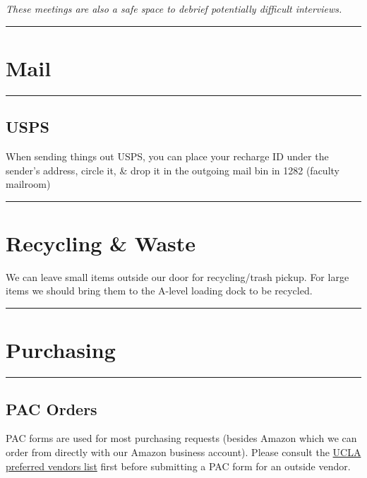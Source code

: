 \documentclass[]{book}
\begin{document}
\emph{These meetings are also a safe space to debrief potentially
difficult interviews.}

\begin{center}\rule{0.5\linewidth}{0.5pt}\end{center}

\section{Mail}\label{mail}

\begin{center}\rule{0.5\linewidth}{0.5pt}\end{center}

\subsection{USPS}\label{usps}

When sending things out USPS, you can place your recharge ID under the
sender's address, circle it, \& drop it in the outgoing mail bin in 1282
(faculty mailroom)

\begin{center}\rule{0.5\linewidth}{0.5pt}\end{center}

\section{Recycling \& Waste}\label{recycling-waste}

We can leave small items outside our door for recycling/trash pickup.
For large items we should bring them to the A-level loading dock to be
recycled.

\begin{center}\rule{0.5\linewidth}{0.5pt}\end{center}

\section{Purchasing}\label{purchasing}

\begin{center}\rule{0.5\linewidth}{0.5pt}\end{center}

\subsection{PAC Orders}\label{pac-orders}

PAC forms are used for most purchasing requests (besides Amazon which we
can order from directly with our Amazon business account). Please
consult the
\href{http://staff.purchasing.ucla.edu/Portal/app/agreements/agreementsummary.aspx}{UCLA
preferred vendors list} first before submitting a PAC form for an
outside vendor.
\end{document}
